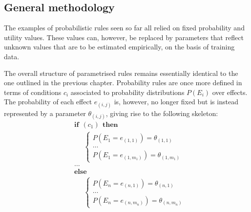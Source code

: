 \subsection{General methodology}

The examples of probabilistic rules seen so far all relied on fixed probability and utility values. These values can, however, be replaced by parameters that reflect unknown values that are to be estimated empirically, on the basis of training data. 
 
The overall structure of parametrised rules remains essentially identical to the one outlined in the previous chapter.  Probability rules are once more defined in terms of conditions $c_i$ associated to probability distributions $P(E_i)$ over effects.  The probability of each effect $e_{(i,j)}$ is, however, no longer fixed but is instead represented by a parameter $\theta_{(i,j)}$, giving rise to the following skeleton: 
\begin{equation}
\begin{aligned}
& \textbf{if} \ \ (c_{1}) \ \ \textbf{then} \\ 
& \;\;\;\;\; \begin{cases}
P(E_1\!=\!e_{(1,1)}) = \theta_{(1,1)} \\
 \dots \\
P(E_1\!=\!e_{(1,m_1)}) = \theta_{(1,m_1)} 
\end{cases} \\[3mm]
& \dots  \\
& \textbf{else} \\
& \;\;\;\;\; \begin{cases}
P(E_{n}\!=\!e_{(n,1)}) = \theta_{(n,1)} \\
\dots \\
P(E_{n}\!=\!e_{(n,m_n)}) = \theta_{(n,m_n)}
\end{cases}
\end{aligned}
\end{equation}

